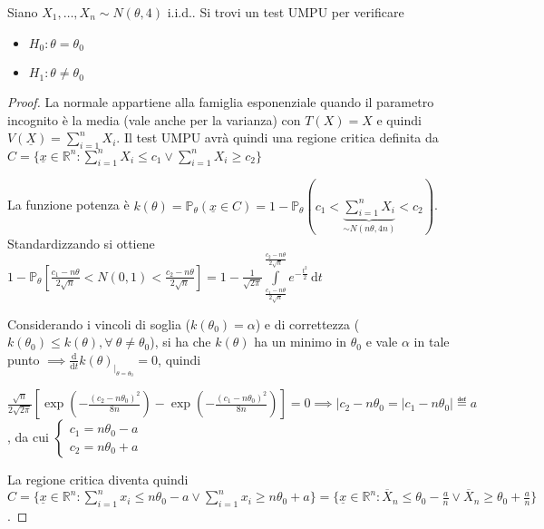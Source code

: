 \documentclass[hidelinks, 10pt]{report}
\begin{document}
\begin{ex}
Siano $ X_{1}, \dotsc, X_{n} \sim N(\theta, 4) $ i.i.d.. Si trovi un test UMPU per verificare 
\begin{itemize}
\item $ H_{0}: \theta = \theta_{0} $
\item $ H_{1}: \theta \ne \theta_{0} $
\end{itemize}
\end{ex}

\begin{proof}
La normale appartiene alla famiglia esponenziale quando il parametro incognito \`e la media (vale anche per la varianza) con $ T(X) = X $ e quindi $ V(\underline{X}) = \sum\limits_{i = 1}^{n} X_{i} $. Il test UMPU avr\`a quindi una regione critica definita da $ C = \{ \underline{x} \in \mathbb{R}^{n} : \sum\limits_{i = 1}^{n} X_{i} \le c_{1} \lor \sum\limits_{i = 1}^{n} X_{i} \ge c_{2} \} $

La funzione potenza \`e $ k(\theta) = \mathbb{P}_{\theta} (\underline{x} \in C) = 1 - \mathbb{P}_{\theta} (c_{1} < \underbrace{\sum\limits_{i = 1}^{n} X_{i}}_{\sim N(n\theta, 4n)} < c_{2}) $. Standardizzando si ottiene $ 1 - \mathbb{P}_{\theta} \left[ \frac{c_{1} - n\theta}{2 \sqrt{n}} < N(0,1) < \frac{c_{2} - n\theta}{2 \sqrt{n}} \right] = 1 - \frac{1}{\sqrt{2 \pi}} \int\limits_{\frac{c_{1} - n\theta}{2 \sqrt{n}}}^{\frac{c_{2} - n\theta}{2 \sqrt{n}}} e^{-\frac{t^{2}}{2}} \, \mathrm{d}t $

Considerando i vincoli di soglia ($ k(\theta_{0}) = \alpha $) e di correttezza ($ k(\theta_{0}) \le k(\theta), \forall\ \theta \ne \theta_{0} $), si ha che $ k(\theta) $ ha un minimo in $ \theta_{0} $ e vale $ \alpha $ in tale punto $ \implies \frac{\mathrm{d}}{\mathrm{d} t} k(\theta)_{\big\vert_{\theta = \theta_{0}}} = 0 $, quindi

$ \frac{\sqrt{n}}{2 \sqrt{2 \pi}} \left[ \exp \left( - \frac{(c_{2} - n \theta_{0})^{2}}{8n} \right) - \exp \left( -\frac{(c_{1} - n\theta_{0})^{2}}{8n} \right) \right] = 0 \implies \vert c_{2} - n\theta_{0} = \vert c_{1} - n \theta_{0} \vert \eqdef a $, da cui $ \begin{cases} c_{1} = n \theta_{0} - a \\ c_{2} = n \theta_{0} + a \end{cases} $

La regione critica diventa quindi $ C = \{ \underline{x} \in \mathbb{R}^{n} : \sum\limits_{i = 1}^{n} x_{i} \le n \theta_{0} - a \lor \sum\limits_{i = 1}^{n} x_{i} \ge n \theta_{0} + a \} = \{ \underline{x} \in \mathbb{R}^{n} : \overline{X}_{n} \le \theta_{0} - \frac{a}{n} \lor \overline{X}_{n} \ge \theta_{0} + \frac{a}{n} \} $.


\end{proof}
\end{document}
